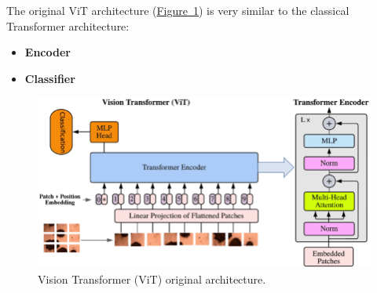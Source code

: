 \documentclass[12pt]{article}
\begin{document}
The original ViT architecture (\hyperref[fig:vit_architecture]{Figure~\ref*{fig:vit_architecture}}) 
is very similar to the classical Transformer architecture:
\begin{itemize}
    \item \textbf{Encoder}
    \item \textbf{Classifier}
\end{itemize}

\begin{figure}
    \centering
    \includegraphics[width=.85\textwidth]{Images/vit_architecture.png}
    \caption{Vision Transformer (ViT) original architecture.}
    \label{fig:vit_architecture}
\end{figure}
\end{document}
